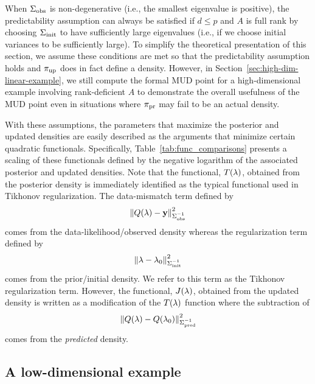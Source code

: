 When $\Sigma_\text{obs}$ is non-degenerative (i.e., the smallest eigenvalue is positive), the predictability assumption can always be satisfied if $d\leq p$ and $A$ is full rank by choosing $\Sigma_\text{init}$ to have sufficiently large eigenvalues (i.e., if we choose initial variances to be sufficiently large).
To simplify the theoretical presentation of this section, we assume these conditions are met so that the predictability assumption holds and $\operatorname*{\pi_{up}}$ does in fact define a density.
However, in Section~\ref{sec:high-dim-linear-example}, we still compute the formal MUD point for a high-dimensional example involving rank-deficient $A$ to demonstrate the overall usefulness of the MUD point even in situations where $\operatorname*{\pi_{pr}}$ may fail to be an actual density.

With these assumptions, the parameters that maximize the posterior and updated densities are easily described as the arguments that minimize certain quadratic functionals.
Specifically, Table~\ref{tab:func_comparisons} presents a scaling of these functionals defined by the negative logarithm of the associated posterior and updated densities.
Note that the functional, $T(\lambda)$, obtained from the posterior density is immediately identified as the typical functional used in Tikhonov regularization.
The data-mismatch term defined by
\begin{equation*}
	\left\Vert Q(\lambda)-\mathbf{y}\right\Vert_{\Sigma_\text{obs}^{-1}}^2
\end{equation*}
comes from the data-likelihood/observed density whereas the regularization term defined by
\begin{equation*}
	 \left\Vert\lambda-\lambda_0\right\Vert_{\Sigma_\text{init}^{-1}}^2
\end{equation*}
comes from the prior/initial density.
We refer to this term as the Tikhonov regularization term.
However, the functional, $J(\lambda)$, obtained from the updated density is written as a modification of the $T(\lambda)$ function where the subtraction of
\begin{equation*}
	 \left\Vert Q(\lambda)-Q(\lambda_0)\right\Vert_{\Sigma_\text{pred}^{-1}}^2
\end{equation*}
comes from the {\em predicted} density.

\subsection{A low-dimensional example}\label{subsec:low-d-example}


